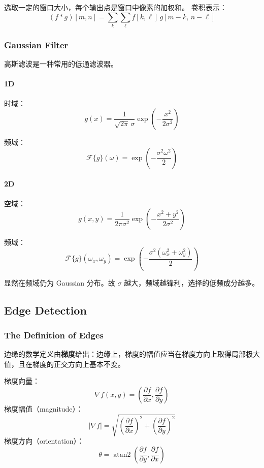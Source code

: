 选取一定的窗口大小，每个输出点是窗口中像素的加权和。 卷积表示： \[
  (f * g)[m,n] = \sum_{k}\sum_{\ell} f[k,\ell]\, g[m-k,\, n-\ell]
\]

\subsubsection{Gaussian Filter}\label{gaussian-filter}

高斯滤波是一种常用的低通滤波器。

\paragraph{1D}\label{d}

时域： \[
  g(x) = \frac{1}{\sqrt{2\pi}\,\sigma} \exp\left(-\frac{x^2}{2\sigma^2}\right)
\]

频域： \[
  \mathcal{F}\{g\}(\omega) = \exp\left(-\frac{\sigma^2 \omega^2}{2}\right)
\]

\paragraph{2D}\label{d-1}

空域： \[
  g(x,y) = \frac{1}{2\pi\sigma^2} \exp\left(-\frac{x^2 + y^2}{2\sigma^2}\right)
\]

频域： \[
  \mathcal{F}\{g\}(\omega_x, \omega_y) = \exp\left(-\frac{\sigma^2 (\omega_x^2 + \omega_y^2)}{2}\right)
\]

显然在频域仍为 Gaussian 分布。故 \(\sigma\)
越大，频域越锋利，选择的低频成分越多。

\subsection{Edge Detection}\label{edge-detection-1}

\subsubsection{The Definition of Edges}\label{the-definition-of-edges}

边缘的数学定义由\textbf{梯度}给出：边缘上，梯度的幅值应当在梯度方向上取得局部极大值，且在梯度的正交方向上基本不变。

梯度向量： \[
  \nabla f(x,y) = \left(\frac{\partial f}{\partial x}, \frac{\partial f}{\partial y}\right)
\] 梯度幅值（magnitude）： \[
  |\nabla f| = \sqrt{\left(\frac{\partial f}{\partial x}\right)^2 + \left(\frac{\partial f}{\partial y}\right)^2}
\] 梯度方向（orientation）： \[
  \theta = \operatorname{atan2} \left(\frac{\partial f}{\partial y}, \frac{\partial f}{\partial x}\right)
\]

